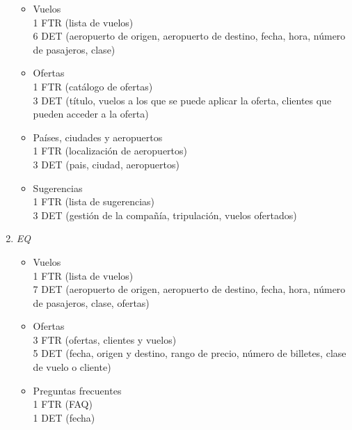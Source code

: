 \begin{enumerate}
		\begin{itemize}
			\item Vuelos \\
			{1 FTR (lista de vuelos)}\\
			{6 DET (aeropuerto de origen, aeropuerto de destino, fecha, hora, número de pasajeros, clase)}\\
			\item Ofertas \\
			{1 FTR (catálogo de ofertas)}\\
			{3 DET (título, vuelos a los que se puede aplicar la oferta, clientes que pueden acceder a la oferta)}\\
			\item Países, ciudades y aeropuertos \\
			{1 FTR (localización de aeropuertos)}\\
			{3 DET (pais, ciudad, aeropuertos)}\\
			\item Sugerencias \\
			{1 FTR (lista de sugerencias)}\\
			{3 DET (gestión de la compañía, tripulación, vuelos ofertados)}\\
		\end{itemize}

	\item \textit{EQ}

		\begin{itemize}
			\item Vuelos \\
			{1 FTR (lista de vuelos)}\\
			{7 DET (aeropuerto de origen, aeropuerto de destino, fecha, hora, número de pasajeros, clase, ofertas)}\\
			\item Ofertas \\
			{3 FTR (ofertas, clientes y vuelos)}\\
			{5 DET (fecha, origen y destino, rango de precio, número de billetes, clase de vuelo o cliente)}\\
			\item Preguntas frecuentes \\
			{1 FTR (FAQ)}\\
			{1 DET (fecha)}\\
		\end{itemize}
	
\end{enumerate}
